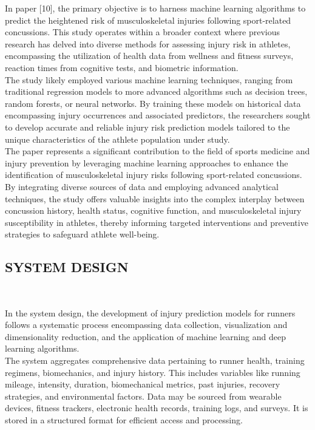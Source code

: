 \documentclass[12pt, English]{article}
\newcommand\tab[1][1cm]{\hspace*{#1}}
\begin{document}
\begin{normalsize}
In paper [10], the primary objective is to harness machine learning algorithms to predict the heightened risk of musculoskeletal injuries following sport-related concussions. This study operates within a broader context where previous research has delved into diverse methods for assessing injury risk in athletes, encompassing the utilization of health data from wellness and fitness surveys, reaction times from cognitive tests, and biometric information.\\
The study likely employed various machine learning techniques, ranging from traditional regression models to more advanced algorithms such as decision trees, random forests, or neural networks. By training these models on historical data encompassing injury occurrences and associated predictors, the researchers sought to develop accurate and reliable injury risk prediction models tailored to the unique characteristics of the athlete population under study.\\
The paper represents a significant contribution to the field of sports medicine and injury prevention by leveraging machine learning approaches to enhance the identification of musculoskeletal injury risks following sport-related concussions. By integrating diverse sources of data and employing advanced analytical techniques, the study offers valuable insights into the complex interplay between concussion history, health status, cognitive function, and musculoskeletal injury susceptibility in athletes, thereby informing targeted interventions and preventive strategies to safeguard athlete well-being.

\newpage

\begin{center}
\section{ \Large SYSTEM DESIGN}
\end{center}
\\
\begin{normalsize}
\tab In the system design, the development of injury prediction models for runners follows a systematic process encompassing data collection, visualization and dimensionality reduction, and the application of machine learning and deep learning algorithms.\\

\tab The system aggregates comprehensive data pertaining to runner health, training regimens, biomechanics, and injury history. This includes variables like running mileage, intensity, duration, biomechanical metrics, past injuries, recovery strategies, and environmental factors. Data may be sourced from wearable devices, fitness trackers, electronic health records, training logs, and surveys. It is stored in a structured format for efficient access and processing.\\


\end{normalsize}
\end{normalsize}
\end{document}
